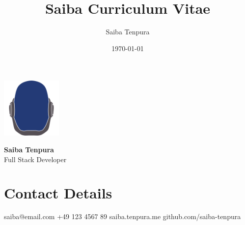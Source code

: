 \documentclass[9pt]{saiba-cv}
\title{Saiba Curriculum Vitae}
\author{Saiba Tenpura}
\date{\today}
\begin{document}

\colorbox{zinc-900}{%
  \begin{minipage}[c][\textheight][t]{0.225\textwidth}
    \color{white}
    \vspace{0.5cm}
    \centering\includegraphics[height=8em]{logo.png}
    \vspace{0.5cm}

    {\Large \textbf{Saiba Tenpura}} \\
    {\large Full Stack Developer}

    \section*{Contact Details}
    \contact
      {saiba@email.com}
      {+49 123 4567 89}
      {saiba.tenpura.me}
      {github.com/saiba-tenpura}

  \end{minipage}
}%
\end{document}
